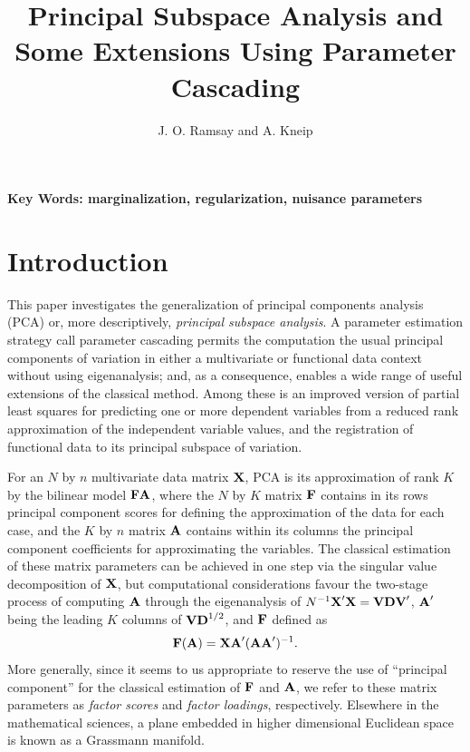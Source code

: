 \documentclass[12pt]{article}
\title{Principal Subspace Analysis and Some Extensions Using Parameter Cascading}
\author{J. O. Ramsay and A. Kneip}
\begin{document}
\maketitle

\begin{abstract}
\end{abstract}

\textbf{Key Words: marginalization, regularization, nuisance parameters}


\section{Introduction}
\label{sec:intro}

This paper investigates the generalization of principal components analysis (PCA) or, more descriptively, \emph{principal subspace analysis}.  A parameter estimation strategy call parameter cascading permits the computation the usual principal components of variation in either a multivariate or functional data context without using eigenanalysis; and, as a consequence, enables a wide range of useful extensions of the classical method.  Among these is an improved version of partial least squares for predicting one or more dependent variables from a reduced rank approximation of the independent variable values, and the registration of functional data to its principal subspace of variation.  

For an $N$ by $n$ multivariate data matrix $\mbox{\bf X}$, PCA  is its approximation of rank $K$ by the bilinear model $\mbox{\bf F} \mbox{\bf A}$, where the $N$ by $K$ matrix $\mbox{\bf F}$ contains in its rows principal component scores for defining the approximation of the data for each case, and the $K$ by $n$ matrix $\mbox{\bf A}$ contains within its columns the principal component coefficients for approximating the variables.  The classical estimation of these matrix parameters can be achieved in one step via the singular value decomposition of $\mbox{\bf X}$, but computational considerations favour the two-stage process of computing $\mbox{\bf A}$ through the eigenanalysis of $N^{-1} \mbox{\bf X}' \mbox{\bf X} = \mbox{\bf V} \mbox{\bf D} \mbox{\bf V}'$, $\mbox{\bf A}'$ being the leading $K$ columns of $\mbox{\bf V} \mbox{\bf D}^{1/2}$, and $\mbox{\bf F}$ defined as 
\begin{equation} \label{Feqtn0}
  \mbox{\bf F}(\mbox{\bf A}) = \mbox{\bf X} \mbox{\bf A}' (\mbox{\bf A} \mbox{\bf A}')^{-1}.
\end{equation}
More generally, since it seems to us appropriate to reserve the use of ``principal component'' for the classical estimation of $\mbox{\bf F}$ and $\mbox{\bf A}$, we refer to these matrix parameters as \emph{factor scores} and \emph{factor loadings}, respectively.  Elsewhere in the mathematical sciences, a plane embedded in higher dimensional Euclidean space is known as a Grassmann manifold.
\end{document}
